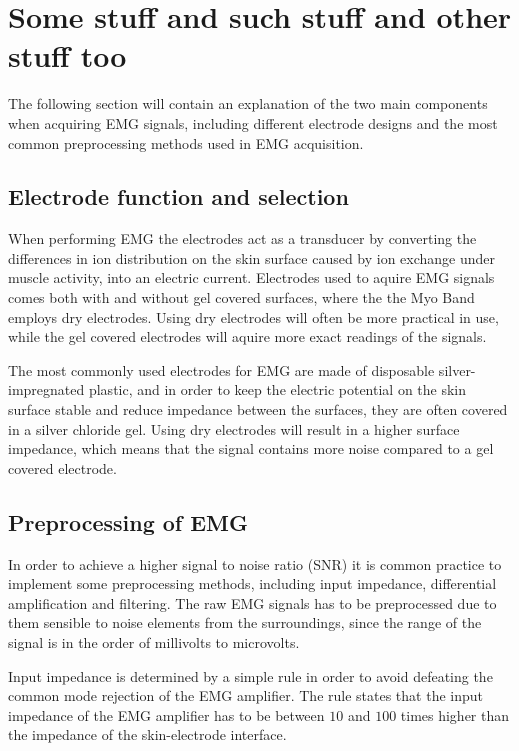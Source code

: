 \section{Some stuff and such stuff and other stuff too}

The following section will contain an explanation of the two main components when acquiring EMG signals, including different electrode designs and the most common preprocessing methods used in EMG acquisition.

\subsection{Electrode function and selection}

When performing EMG the electrodes act as a transducer by converting the differences in ion distribution on the skin surface caused by ion exchange under muscle activity, into an electric current. Electrodes used to aquire EMG signals comes both with and without gel covered surfaces, where the the Myo Band employs dry electrodes. Using dry electrodes will often be more practical in use, while the gel covered electrodes will aquire more exact readings of the signals. \cite{lee2008 , cram2012}

The most commonly used electrodes for EMG are made of disposable silver-impregnated plastic, and in order to keep the electric potential on the skin surface stable and reduce impedance between the surfaces, they are often covered in a silver chloride gel. Using dry electrodes will result in  a higher surface impedance, which means that the signal contains more noise compared to a gel covered electrode.\cite{cram2012}

\subsection{Preprocessing of EMG}

In order to achieve a higher signal to noise ratio (SNR) it is common practice to implement some preprocessing methods, including input impedance, differential amplification and filtering. The raw EMG signals has to be preprocessed due to them sensible to noise elements from the surroundings, since the range of the signal is in the order of millivolts to microvolts.\cite{cram2012}

Input impedance is determined by a simple rule in order to avoid defeating the common mode rejection of the EMG amplifier. The rule states that the input impedance of the EMG amplifier has to be between $10$ and $100$ times higher than the impedance of the skin-electrode interface.\cite{cram2012}

